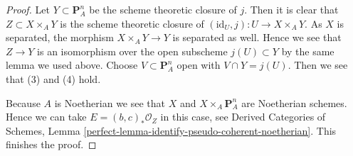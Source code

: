 \begin{proof}
\medskip\noindent
Let $Y \subset \mathbf{P}^n_A$ be the scheme theoretic
closure of $j$. Then it is clear that $Z \subset X \times_A Y$
is the scheme theoretic closure of
$(\text{id}_U, j) : U \to X \times_A Y$.
As $X$ is separated, the morphism
$X \times_A Y \to Y$ is separated as well.
Hence we see that $Z \to Y$ is an isomorphism over
the open subscheme $j(U) \subset Y$ by the same lemma we used above.
Choose $V \subset \mathbf{P}^n_A$ open with $V \cap Y = j(U)$.
Then we see that (3) and (4) hold.

\medskip\noindent
Because $A$ is Noetherian we see that $X$ and $X \times_A \mathbf{P}^n_A$
are Noetherian schemes. Hence we can take $E = (b, c)_*\mathcal{O}_Z$
in this case, see Derived Categories of Schemes, Lemma
\ref{perfect-lemma-identify-pseudo-coherent-noetherian}.
This finishes the proof.
\end{proof}